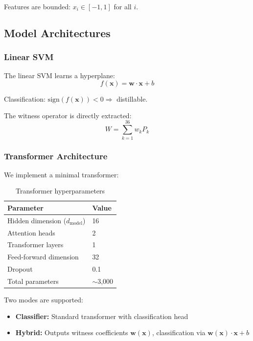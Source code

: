 \documentclass[11pt,a4paper]{article}
\begin{document}
Features are bounded: $x_i \in [-1, 1]$ for all $i$.

\subsection{Model Architectures}

\subsubsection{Linear SVM}

The linear SVM learns a hyperplane:
\begin{equation}
f(\mathbf{x}) = \mathbf{w} \cdot \mathbf{x} + b
\end{equation}

Classification: $\text{sign}(f(\mathbf{x})) < 0 \Rightarrow$ distillable.

The witness operator is directly extracted:
\begin{equation}
W = \sum_{k=1}^{36} w_k P_k
\end{equation}

\subsubsection{Transformer Architecture}

We implement a minimal transformer:

\begin{table}[h]
\centering
\caption{Transformer hyperparameters}
\begin{tabular}{ll}
\toprule
\textbf{Parameter} & \textbf{Value} \\
\midrule
Hidden dimension ($d_{\text{model}}$) & 16 \\
Attention heads & 2 \\
Transformer layers & 1 \\
Feed-forward dimension & 32 \\
Dropout & 0.1 \\
Total parameters & $\sim$3,000 \\
\bottomrule
\end{tabular}
\end{table}

Two modes are supported:
\begin{itemize}[noitemsep]
    \item \textbf{Classifier:} Standard transformer with classification head
    \item \textbf{Hybrid:} Outputs witness coefficients $\mathbf{w}(\mathbf{x})$, classification via $\mathbf{w}(\mathbf{x}) \cdot \mathbf{x} + b$
\end{itemize}
\end{document}
